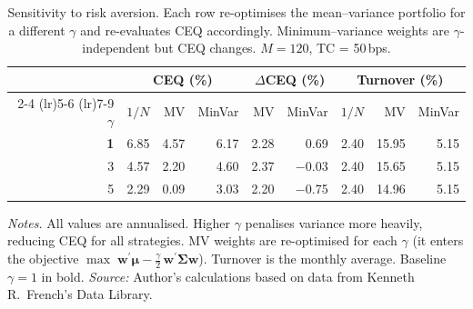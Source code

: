\begin{table}[htbp]
  \centering
  \caption[Sensitivity to risk aversion]{Sensitivity to risk aversion. Each row re-optimises the mean--variance portfolio for a different $\gamma$ and re-evaluates CEQ accordingly. Minimum--variance weights are $\gamma$-independent but CEQ changes. $M=120$, TC = 50\,bps.}
  \label{tab:gamma_robust}
  \small
  \begin{tabular}{r *{8}{r}}
    \toprule
    & \multicolumn{3}{c}{CEQ (\%)} & \multicolumn{2}{c}{$\Delta$CEQ (\%)} & \multicolumn{3}{c}{Turnover (\%)} \\
    \cmidrule(lr){2-4} \cmidrule(lr){5-6} \cmidrule(lr){7-9}
    $\gamma$ & $1/N$ & MV & MinVar & MV & MinVar & $1/N$ & MV & MinVar \\
    \midrule
    \textbf{1} & 6.85 & 4.57 & 6.17 & 2.28 & 0.69 & 2.40 & 15.95 & 5.15 \\
    3 & 4.57 & 2.20 & 4.60 & 2.37 & $-$0.03 & 2.40 & 15.65 & 5.15 \\
    5 & 2.29 & 0.09 & 3.03 & 2.20 & $-$0.75 & 2.40 & 14.96 & 5.15 \\
    \bottomrule
  \end{tabular}

  \smallskip
  \begin{minipage}{\textwidth}
    \footnotesize
    \textit{Notes.} All values are annualised. Higher $\gamma$ penalises variance more heavily, reducing CEQ for all strategies. MV weights are re-optimised for each $\gamma$ (it enters the objective $\max\; \mathbf{w}^{\prime}\boldsymbol{\mu} - \tfrac{\gamma}{2}\,\mathbf{w}^{\prime}\boldsymbol{\Sigma}\mathbf{w}$). Turnover is the monthly average. Baseline $\gamma=1$ in bold.
    \textit{Source:} Author's calculations based on data from Kenneth R.\ French's Data Library.
  \end{minipage}
\end{table}
